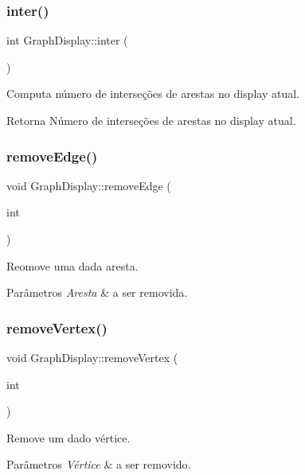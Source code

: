 \subsubsection{\texorpdfstring{inter()}{inter()}}
{\footnotesize\ttfamily int Graph\+Display\+::inter (\begin{DoxyParamCaption}{ }\end{DoxyParamCaption})}

Computa número de interseções de arestas no display atual. \begin{DoxyReturn}{Retorna}
Número de interseções de arestas no display atual. 
\end{DoxyReturn}
\mbox{\label{classGraphDisplay_adb5477315cf0e2435556c999a7c0cb8c}} 
\subsubsection{\texorpdfstring{removeEdge()}{removeEdge()}}
{\footnotesize\ttfamily void Graph\+Display\+::remove\+Edge (\begin{DoxyParamCaption}\item[{int}]{ }\end{DoxyParamCaption})}

Reomove uma dada aresta. 
\begin{DoxyParams}{Parâmetros}
{\em Aresta} & a ser removida. \\
\hline
\end{DoxyParams}
\mbox{\label{classGraphDisplay_adc84fa190931d2a2f73463ed211e0b71}} 
\subsubsection{\texorpdfstring{removeVertex()}{removeVertex()}}
{\footnotesize\ttfamily void Graph\+Display\+::remove\+Vertex (\begin{DoxyParamCaption}\item[{int}]{ }\end{DoxyParamCaption})}

Remove um dado vértice. 
\begin{DoxyParams}{Parâmetros}
{\em Vértice} & a ser removido. \\
\hline
\end{DoxyParams}
\mbox{\label{classGraphDisplay_a496ee74caea737ce5f93f9d23474eb6d}} 
